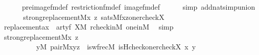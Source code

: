\begin{isabellebody}
\ \ \ \ \ \ pre{\isacharunderscore}{\kern0pt}image{\isacharunderscore}{\kern0pt}fm{\isacharunderscore}{\kern0pt}def\ restriction{\isacharunderscore}{\kern0pt}fm{\isacharunderscore}{\kern0pt}def\ image{\isacharunderscore}{\kern0pt}fm{\isacharunderscore}{\kern0pt}def\isanewline
\ \ \ \ \isamarkupfalse%
\ {\isacharparenleft}{\kern0pt}simp\ add{\isacharcolon}{\kern0pt}nat{\isacharunderscore}{\kern0pt}simp{\isacharunderscore}{\kern0pt}union{\isacharparenright}{\kern0pt}\isanewline
\ \ \isamarkupfalse%
\isanewline
\ \ \isamarkupfalse%
\ {\isachardoublequoteopen}strong{\isacharunderscore}{\kern0pt}replacement{\isacharparenleft}{\kern0pt}{\isacharhash}{\kern0pt}{\isacharhash}{\kern0pt}M{\isacharcomma}{\kern0pt}{\isasymlambda}x\ z{\isachardot}{\kern0pt}\ sats{\isacharparenleft}{\kern0pt}M{\isacharcomma}{\kern0pt}{\isacharquery}{\kern0pt}f{\isacharcomma}{\kern0pt}{\isacharbrackleft}{\kern0pt}x{\isacharcomma}{\kern0pt}z{\isacharcomma}{\kern0pt}one{\isacharcomma}{\kern0pt}rcheck{\isacharparenleft}{\kern0pt}X{\isacharparenright}{\kern0pt}{\isacharbrackright}{\kern0pt}{\isacharparenright}{\kern0pt}{\isacharparenright}{\kern0pt}{\isachardoublequoteclose}\isanewline
\ \ \ \ \isamarkupfalse%
\ replacement{\isacharunderscore}{\kern0pt}ax\ {}\ artyf\ {\isacartoucheopen}X{\isasymin}M{\isacartoucheclose}\ rcheck{\isacharunderscore}{\kern0pt}in{\isacharunderscore}{\kern0pt}M\ one{\isacharunderscore}{\kern0pt}in{\isacharunderscore}{\kern0pt}M\ \isamarkupfalse%
\ simp\isanewline
\ \ \isamarkupfalse%
\isanewline
\ \ \isamarkupfalse%
\ {\isachardoublequoteopen}strong{\isacharunderscore}{\kern0pt}replacement{\isacharparenleft}{\kern0pt}{\isacharhash}{\kern0pt}{\isacharhash}{\kern0pt}M{\isacharcomma}{\kern0pt}{\isasymlambda}x\ z{\isachardot}{\kern0pt}\isanewline
\ \ \ \ \ \ \ \ \ \ {\isasymexists}y{\isasymin}M{\isachardot}{\kern0pt}\ pair{\isacharparenleft}{\kern0pt}{\isacharhash}{\kern0pt}{\isacharhash}{\kern0pt}M{\isacharcomma}{\kern0pt}x{\isacharcomma}{\kern0pt}y{\isacharcomma}{\kern0pt}z{\isacharparenright}{\kern0pt}\ {\isacharampersand}{\kern0pt}\ is{\isacharunderscore}{\kern0pt}wfrec{\isacharparenleft}{\kern0pt}{\isacharhash}{\kern0pt}{\isacharhash}{\kern0pt}M{\isacharcomma}{\kern0pt}\ is{\isacharunderscore}{\kern0pt}Hcheck{\isacharparenleft}{\kern0pt}one{\isacharparenright}{\kern0pt}{\isacharcomma}{\kern0pt}rcheck{\isacharparenleft}{\kern0pt}X{\isacharparenright}{\kern0pt}{\isacharcomma}{\kern0pt}\ x{\isacharcomma}{\kern0pt}\ y{\isacharparenright}{\kern0pt}{\isacharparenright}{\kern0pt}{\isachardoublequoteclose}\isanewline

\end{isabellebody}
